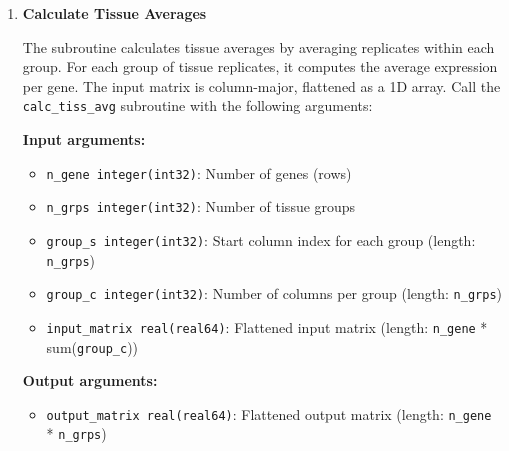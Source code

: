 \begin{enumerate}
\begin{enumerate}
\begin{itemize}
                    \item \texttt{stack\_right integer(int32)}: Manual quicksort stack (same
                          size as stack\_left)
                          
                    \item \texttt{ierr integer(int32)}: Error code (for error details
                          please check \hyperref[sec:error-handling]{error handling section}
                          )
                  \end{itemize}
                  \begin{lstlisting}[language=Fortran, caption={Quantile Normalization}]
call quantile_normalization(n_genes, n_tissues, input_matrix, output_matrix, temp_col, rank_means, perm, stack_left, stack_right, max_stack, ierr)
                  \end{lstlisting}
                  
            \item \textbf{Calculate Tissue Averages}
                  
                  The subroutine calculates tissue averages by averaging replicates within
                  each group. For each group of tissue replicates, it computes the average
                  expression per gene. The input matrix is column-major, flattened as a 1D
                  array. Call the \texttt{calc\_tiss\_avg} subroutine with the following
                  arguments:
                  
                  \textbf{Input arguments:}
                  \begin{itemize}
                    \item \texttt{n\_gene integer(int32)}: Number of genes (rows)
                          
                    \item \texttt{n\_grps integer(int32)}: Number of tissue groups
                          
                    \item \texttt{group\_s integer(int32)}: Start column index for each group
                          (length: \texttt{n\_grps})
                          
                    \item \texttt{group\_c integer(int32)}: Number of columns per group (length:
                          \texttt{n\_grps})
                          
                    \item \texttt{input\_matrix real(real64)}: Flattened input matrix (length:
                          \texttt{n\_gene} * sum(\texttt{group\_c}))
                  \end{itemize}
                  \textbf{Output arguments:}
                  \begin{itemize}
                    \item \texttt{output\_matrix real(real64)}: Flattened output matrix (length:
                          \texttt{n\_gene} * \texttt{n\_grps})
                          

\end{itemize}
\end{enumerate}
\end{enumerate}
